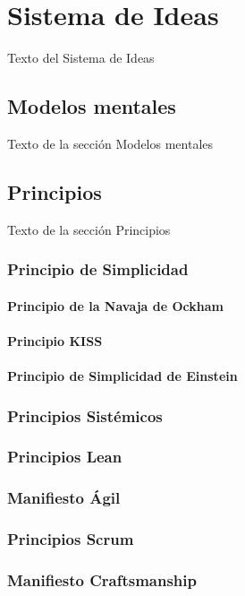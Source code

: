 
\chapter{Sistema de Ideas}

Texto del Sistema de Ideas

\section{Modelos mentales}

Texto de la sección Modelos mentales

\section{Principios}

Texto de la sección Principios

\subsection{Principio de Simplicidad}
\subsubsection{Principio de la Navaja de Ockham}
\subsubsection{Principio KISS}
\subsubsection{Principio de Simplicidad de Einstein}

\subsection{Principios Sistémicos}
\subsection{Principios Lean}
\subsection{Manifiesto Ágil}
\subsection{Principios Scrum}
\subsection{Manifiesto Craftsmanship}

